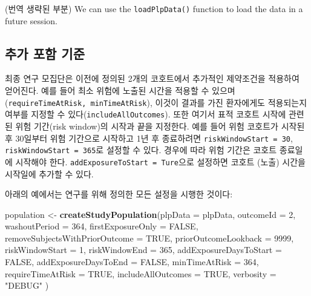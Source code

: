 \documentclass[11pt]{book}
\newenvironment{Shaded}{\begin{snugshade}}{\end{snugshade}}
\newcommand{\KeywordTok}[1]{\textcolor[rgb]{0.13,0.29,0.53}{\textbf{#1}}}
\newcommand{\DataTypeTok}[1]{\textcolor[rgb]{0.13,0.29,0.53}{#1}}
\newcommand{\DecValTok}[1]{\textcolor[rgb]{0.00,0.00,0.81}{#1}}
\newcommand{\StringTok}[1]{\textcolor[rgb]{0.31,0.60,0.02}{#1}}
\newcommand{\OtherTok}[1]{\textcolor[rgb]{0.56,0.35,0.01}{#1}}
\newcommand{\NormalTok}[1]{#1}
\theoremstyle{definition}
\theoremstyle{definition}
\theoremstyle{definition}
\theoremstyle{remark}
\begin{document}
(번역 생략된 부분) We can use the \texttt{loadPlpData()} function to
load the data in a future session.

\subsection{추가 포함 기준}\label{--}

최종 연구 모집단은 이전에 정의된 2개의 코호트에서 추가적인 제약조건을
적용하여 얻어진다. 예를 들어 최소 위험에 노출된 시간을 적용할 수
있으며(\texttt{requireTimeAtRisk,\ minTimeAtRisk}), 이것이 결과를 가진
환자에게도 적용되는지 여부를 지정할 수
있다(\texttt{includeAllOutcomes}). 또한 여기서 표적 코호트 시작에 관련된
위험 기간(risk window)의 시작과 끝을 지정한다. 예를 들어 위험 코호트가
시작된 후 30일부터 위험 기간으로 시작하고 1년 후 종료하려면
\texttt{riskWindowStart\ =\ 30}, \texttt{riskWindowStart\ =\ 365}로
설정할 수 있다. 경우에 따라 위험 기간은 코호트 종료일에 시작해야 한다.
\texttt{addExposureToStart\ =\ Ture}으로 설정하면 코호트 (노출) 시간을
시작일에 추가할 수 있다.

아래의 예에서는 연구를 위해 정의한 모든 설정을 시행한 것이다:

\begin{Shaded}
\begin{Highlighting}[]
\NormalTok{population <-}\StringTok{ }\KeywordTok{createStudyPopulation}\NormalTok{(}\DataTypeTok{plpData =}\NormalTok{ plpData,}
                                    \DataTypeTok{outcomeId =} \DecValTok{2}\NormalTok{,}
                                    \DataTypeTok{washoutPeriod =} \DecValTok{364}\NormalTok{,}
                                    \DataTypeTok{firstExposureOnly =} \OtherTok{FALSE}\NormalTok{,}
                                    \DataTypeTok{removeSubjectsWithPriorOutcome =} \OtherTok{TRUE}\NormalTok{,}
                                    \DataTypeTok{priorOutcomeLookback =} \DecValTok{9999}\NormalTok{,}
                                    \DataTypeTok{riskWindowStart =} \DecValTok{1}\NormalTok{,}
                                    \DataTypeTok{riskWindowEnd =} \DecValTok{365}\NormalTok{,}
                                    \DataTypeTok{addExposureDaysToStart =} \OtherTok{FALSE}\NormalTok{,}
                                    \DataTypeTok{addExposureDaysToEnd =} \OtherTok{FALSE}\NormalTok{,}
                                    \DataTypeTok{minTimeAtRisk =} \DecValTok{364}\NormalTok{,}
                                    \DataTypeTok{requireTimeAtRisk =} \OtherTok{TRUE}\NormalTok{,}
                                    \DataTypeTok{includeAllOutcomes =} \OtherTok{TRUE}\NormalTok{,}
                                    \DataTypeTok{verbosity =} \StringTok{"DEBUG"}
\NormalTok{)}
\end{Highlighting}
\end{Shaded}
\end{document}
